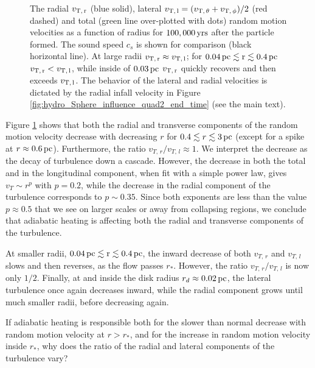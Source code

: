 \documentclass[../dissertation.tex]{subfiles}
\begin{document}
%
\begin{figure}[htb]%
\caption[Hydro Radial vs Lateral Turbulence]{The radial $v_{\rm T,\, r}$ (blue solid), lateral 
$v_{\rm T,\, l}=(v_{{\rm T},\,\theta}+v_{{\rm T},\,\phi})/2$ (red dashed) and total 
(green line over-plotted with dots) random motion velocities as a function of 
radius for \partB 
$100,000\,\rm yrs$ after the particle formed. The sound speed $c_s$ is shown for 
comparison (black horizontal line).
At large radii $v_{\rm T,\, r}\approx v_{\rm T,\, l}$; for 
$0.04\,\rm pc\lesssim r\lesssim 0.4\,\rm pc$
$v_{\rm T,\, r}< v_{\rm T,\, l}$, while inside of 
$0.03\,\rm pc$ $v_{\rm T,\, r}$ quickly recovers and
then exceeds $v_{\rm T,\, l}$.
The behavior of the lateral and radial velocities is dictated by the 
radial infall velocity in Figure \ref{fig:hydro_Sphere_influence_quad2_end_time} 
(see the main text). \label{fig:hydro_make_up_of_Turbulent}}
\end{figure}
%

Figure \ref{fig:hydro_make_up_of_Turbulent} shows that both the radial and
transverse components of the random motion velocity decrease with
decreasing $r$ for $0.4\lesssim r\lesssim 3\,\rm pc$ (except for a spike
at $r\approx0.6\,\rm pc$). Furthermore, the ratio $v_{T,\, r}/v_{T,\, l}\approx 1$. 
We interpret the decrease as the decay of turbulence down a cascade.
However, the decrease in both the total and in the
longitudinal component, when fit with a simple power law, 
gives $v_T\sim r^p$ with $p=0.2$,
while the decrease in the radial component of the turbulence
corresponds to $p\sim0.35$. Since both exponents are less than the
value $p\approx0.5$ that we see on larger scales or away from collapsing
regions, we conclude that adiabatic heating is affecting both the
radial and transverse components of the turbulence.

At smaller radii, $0.04\,\rm pc\lesssim r\lesssim0.4\,\rm pc$, the inward decrease of both 
$v_{T,\, r}$ and $v_{T, \, l}$ slows and then reverses, as the flow passes $r_*$. 
However, the ratio $v_{T,\, r}/v_{T, \, l}$ is now only $1/2$. 
Finally, at and inside the disk radius $r_d\approx 0.02\,\rm pc$, the lateral 
turbulence once again decreases inward, while the radial component 
grows until much smaller radii, before decreasing again. 

If adiabatic heating is responsible both for the slower than normal decrease with
random motion velocity at $r>r_*$, and for the increase in random motion velocity 
inside $r_*$, why does the ratio of the radial and lateral components of the 
turbulence vary? 
\end{document}
